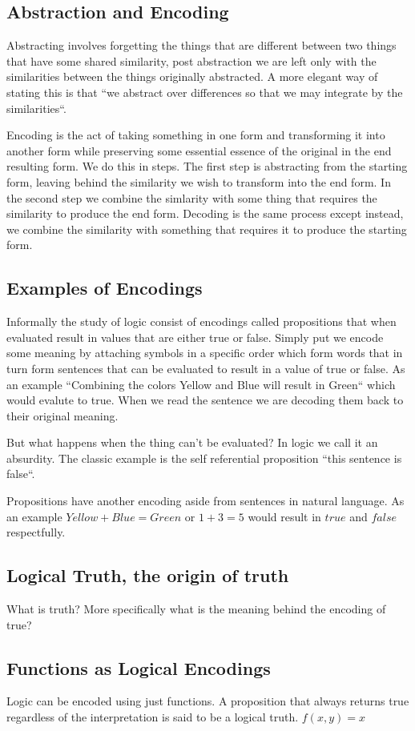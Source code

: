 \subsection{Abstraction and Encoding}

Abstracting involves forgetting the things that are different between two things that have some shared similarity, post abstraction we are left only with the similarities between the things originally abstracted. A more elegant way 
of stating this is that ``we abstract over differences so that we may integrate by the similarities``. 

Encoding is the act of taking something in one form and transforming it into another form while preserving some essential essence of the original in the end resulting form. We do this in steps. The first step is abstracting from the starting form, leaving behind the similarity we wish to transform into the end form. In the second step we combine the simlarity with some thing that requires the similarity to produce the end form. Decoding is the same process except instead, we combine the similarity with something that requires it to produce the starting form.

\subsection{Examples of Encodings}

Informally the study of logic consist of encodings called propositions that when evaluated result in values that are either true or false. Simply put we encode some meaning by attaching symbols in a specific order which form words that in turn form sentences that can be evaluated to result in a value of true or false. As an example ``Combining the colors Yellow and Blue will result in Green`` which would evalute to true. When we read the sentence we are decoding them back to their original meaning. 

But what happens when the thing can't be evaluated? In logic we call it an absurdity. The classic example is the self referential proposition ``this sentence is false``.

Propositions have another encoding aside from sentences in natural language. As an example $Yellow + Blue = Green$ or $1 + 3 = 5$ would result in $true$ and $false$ respectfully.

\subsection{Logical Truth, the origin of truth}
What is truth? More specifically what is the meaning behind the encoding of true?

\subsection{Functions as Logical Encodings}
Logic can be encoded using just functions. A proposition that always returns true regardless of the interpretation is said to be a logical truth. $f(x,y)=x$